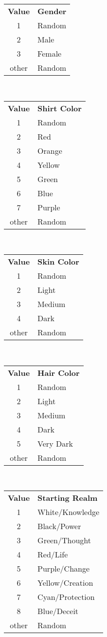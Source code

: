 \documentclass{article}
\begin{document}
\begin{center}

\begin{tabular}{c l}
\textbf{Value} & \textbf{Gender} \\
1 & Random \\
2 & Male \\
3 & Female \\
other & Random\\
\end{tabular}
\\ \vspace{14pt}
\begin{tabular}{c l}
\textbf{Value} & \textbf{Shirt Color } \\
1 & Random \\
2 & Red \\
3 & Orange \\
4 & Yellow \\
5 & Green \\
6 & Blue \\
7 & Purple \\
other & Random \\
\end{tabular}
\\ \vspace{14pt}
\begin{tabular}{c l}
\textbf{Value} & \textbf{Skin Color} \\
1 & Random \\
2 & Light \\
3 & Medium \\
4 & Dark \\
other & Random \\
\end{tabular}
\\ \vspace{14pt}
\begin{tabular}{c l}
\textbf{Value} & \textbf{Hair Color} \\
1 & Random \\
2 & Light \\
3 & Medium \\
4 & Dark \\
5 & Very Dark \\
other & Random \\
\end{tabular}
\\ \vspace{14pt}
\begin{tabular}{c l}
\textbf{Value} & \textbf{Starting Realm} \\
1 & White/Knowledge \\
2 & Black/Power \\
3 & Green/Thought \\
4 & Red/Life \\
5 & Purple/Change \\
6 & Yellow/Creation \\
7 & Cyan/Protection \\
8 & Blue/Deceit \\
other & Random \\
\end{tabular}
\end{center}
\end{document}
